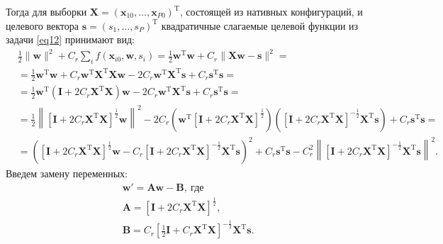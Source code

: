 \documentclass[12pt,twoside]{article}
\begin{document}
Тогда для выборки ${\mathbf{X}}=({\mathbf{x}}_{10}, \dots, {\mathbf{x}}_{P0})^{\text{T}}$, состоящей из нативных конфигураций, и целевого вектора  $\mathbf{s}=(s_1,\dots,s_P)^{\text{T}}$ квадратичные слагаемые целевой функции из задачи \eqref{eq12} принимают вид:
\begin{equation*}
\begin{aligned}
& \frac{1}{2} \|{\mathbf{w}}\|^2 + C_{r}\sum\limits_{i} f({\mathbf{x}}_{i0},{\mathbf{w}}, s_i)=\frac{1}{2}{\mathbf{w}}^{\text{T}}{\mathbf{w}}+C_{r}\|{\mathbf{X}}{\mathbf{w}} - \mathbf{s}\|^2 =\\
& = \frac{1}{2}{\mathbf{w}}^{\text{T}}{\mathbf{w}}+ C_{r}{\mathbf{w}}^{\text{T}}{\mathbf{X}}^{\text{T}}{\mathbf{X}}{\mathbf{w}}- 2C_{r}{\mathbf{w}}^{\text{T}}{\mathbf{X}}^{\text{T}}\mathbf{s} + C_{r}\mathbf{s}^{\text{T}}\mathbf{s}=\\
& = \frac{1}{2}{\mathbf{w}}^{\text{T}}\left(\mathbf{I} + 2C_{r}{\mathbf{X}}^{\text{T}}{\mathbf{X}}\right){\mathbf{w}}- 2C_{r}{\mathbf{w}}^{\text{T}}{\mathbf{X}}^{\text{T}}\mathbf{s}+ C_{r}\mathbf{s}^{\text{T}}\mathbf{s}=\\
& = \frac{1}{2}\left\|\left[\mathbf{I} + 2C_{r}{\mathbf{X}}^{\text{T}}{\mathbf{X}}\right]^{\frac{1}{2}}{\mathbf{w}}\right\|^2- 2C_{r}\left({\mathbf{w}}^{\text{T}}\left[\mathbf{I} + 2C_{r}{\mathbf{X}}^{\text{T}}{\mathbf{X}}\right]^{\frac{1}{2}}\right)
\left(\left[\mathbf{I} + 2C_{r}{\mathbf{X}}^{\text{T}}{\mathbf{X}}\right]^{-\frac{1}{2}}
{\mathbf{X}}^{\text{T}}\mathbf{s}\right)+ C_{r}\mathbf{s}^{\text{T}}\mathbf{s}=\\
& = \left(\left[\mathbf{I} + 2C_{r}{\mathbf{X}}^{\text{T}}{\mathbf{X}}\right]^{\frac{1}{2}}{\mathbf{w}} - C_r\left[\mathbf{I} + 2C_{r}{\mathbf{X}}^{\text{T}}{\mathbf{X}}\right]^{-\frac{1}{2}}
{\mathbf{X}}^{\text{T}}\mathbf{s}\right)^2 + C_r\mathbf{s}^{\text{T}}\mathbf{s}- C_r^2\left\|\left[\mathbf{I} + 2C_{r}{\mathbf{X}}^{\text{T}}{\mathbf{X}}\right]^{-\frac12}
{\mathbf{X}}^{\text{T}}\mathbf{s}\right\|^2.
\end{aligned}
\end{equation*}
Введем замену переменных:
\begin{equation}\label{eq16}
\begin{aligned}
& \mathbf{w}'= \mathbf{A}{\mathbf{w}} - \mathbf{B}, \ \text{где} \\
& \mathbf{A}=\left[\mathbf{I} + 2C_{r}{\mathbf{X}}^{\text{T}}{\mathbf{X}}\right]^{\frac{1}{2}},\\
& \mathbf{B}=C_r\left[\frac{1}{2}\mathbf{I} + C_{r}{\mathbf{X}}^{\text{T}}{\mathbf{X}}\right]^{-\frac{1}{2}}
{\mathbf{X}}^{\text{T}}\mathbf{s}.
\end{aligned}
\end{equation}
\end{document}
